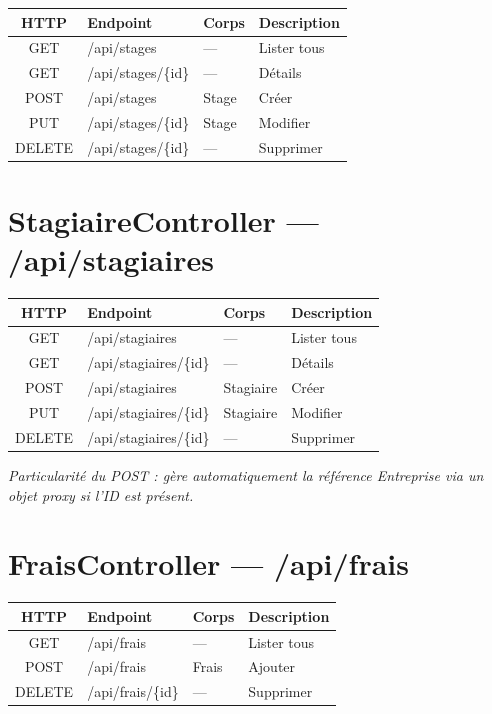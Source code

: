 \documentclass[12pt,a4paper]{report}
\begin{document}
\begin{table}[H]
\centering
\begin{tabular}{|c|l|l|p{4cm}|}
\hline
\textbf{HTTP} & \textbf{Endpoint} & \textbf{Corps} & \textbf{Description} \\ \hline
GET & /api/stages & --- & Lister tous \\ \hline
GET & /api/stages/\{id\} & --- & Détails \\ \hline
POST & /api/stages & Stage & Créer \\ \hline
PUT & /api/stages/\{id\} & Stage & Modifier \\ \hline
DELETE & /api/stages/\{id\} & --- & Supprimer \\ \hline
\end{tabular}
\end{table}

\section{StagiaireController --- /api/stagiaires}

\begin{table}[H]
\centering
\begin{tabular}{|c|l|l|p{4cm}|}
\hline
\textbf{HTTP} & \textbf{Endpoint} & \textbf{Corps} & \textbf{Description} \\ \hline
GET & /api/stagiaires & --- & Lister tous \\ \hline
GET & /api/stagiaires/\{id\} & --- & Détails \\ \hline
POST & /api/stagiaires & Stagiaire & Créer \\ \hline
PUT & /api/stagiaires/\{id\} & Stagiaire & Modifier \\ \hline
DELETE & /api/stagiaires/\{id\} & --- & Supprimer \\ \hline
\end{tabular}
\end{table}

\textit{Particularité du POST : gère automatiquement la référence Entreprise via un objet proxy si l'ID est présent.}

\section{FraisController --- /api/frais}

\begin{table}[H]
\centering
\begin{tabular}{|c|l|l|p{4cm}|}
\hline
\textbf{HTTP} & \textbf{Endpoint} & \textbf{Corps} & \textbf{Description} \\ \hline
GET & /api/frais & --- & Lister tous \\ \hline
POST & /api/frais & Frais & Ajouter \\ \hline
DELETE & /api/frais/\{id\} & --- & Supprimer \\ \hline
\end{tabular}
\end{table}
\end{document}

